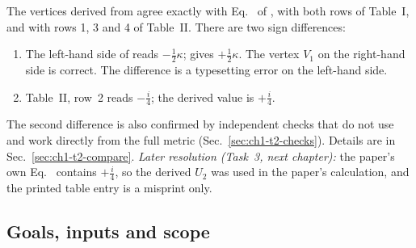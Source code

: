 \begin{discbox}
The vertices derived from  agree exactly with Eq.~ of \PI, with
both rows of Table~I, and with rows 1, 3 and 4 of Table~II. There are two sign
differences:
\begin{enumerate}[leftmargin=1.6em,label=(\roman*)]
\item The left-hand side of  reads $-\tfrac12\kappa$;  gives
$+\tfrac12\kappa$. The vertex $V_1$ on the right-hand side is correct. The
difference is a typesetting error on the left-hand side.
\item Table~II, row~2 reads $-\tfrac i4$; the derived value is $+\tfrac i4$.
\end{enumerate}
The second difference is also confirmed by independent checks that do not use
 and work directly from the full metric
(Sec.~\ref{sec:ch1-t2-checks}). Details are in Sec.~\ref{sec:ch1-t2-compare}.
\emph{Later resolution (Task~3, next chapter):} the paper's own Eq.~
contains $+\tfrac i4$, so the derived $U_2$ was used in the paper's
calculation, and the printed table entry is a misprint only.
\end{discbox}

\subsection{Goals, inputs and scope}

